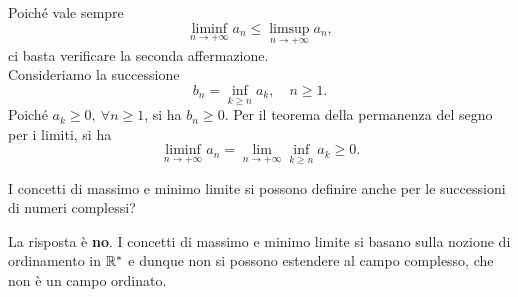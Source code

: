 \begin{solution} Poiché vale sempre
\begin{equation*}
	\liminf_{n\to +\infty} a_n \leq \limsup_{n\to +\infty} a_n,
\end{equation*}
ci basta verificare la seconda affermazione.\\
Consideriamo la successione
\begin{equation*}
	b_n=\inf_{k\geq n} a_k,\quad n\geq 1.
\end{equation*}	
Poiché $a_k\geq 0,\ \forall n\geq 1$, si ha $b_n\geq 0$. Per il teorema della permanenza del segno per i limiti, si ha
\begin{equation*}
	\liminf_{n\to +\infty} a_n=\lim_{n\to+\infty}\inf_{k\geq n} a_k\geq 0.
\end{equation*}
\end{solution}
\begin{exercise}
I concetti di massimo e minimo limite si possono definire anche per le successioni di numeri complessi?
\end{exercise}
\begin{solution}
La risposta è \textbf{no}.  I concetti di massimo e minimo limite si basano sulla nozione di ordinamento in $\mathbb{R}^{\ast}$ e dunque non si possono estendere al campo complesso, che non è un campo ordinato.
\end{solution}
